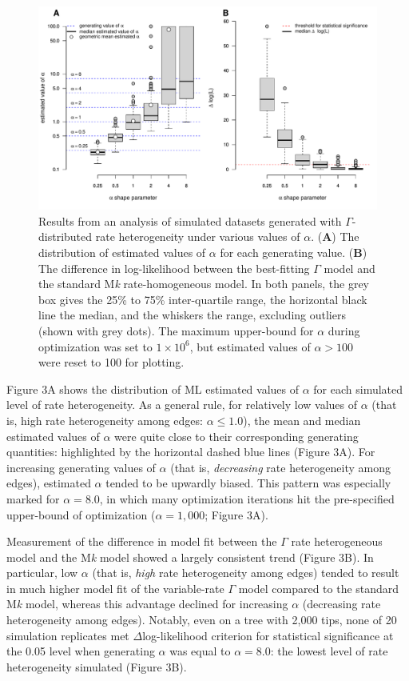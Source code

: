 \documentclass[fleqn,10pt,lineno]{wlpeerj} %
\begin{document}
\begin{figure}
\includegraphics[width=1\linewidth]{Revell-and-Harmon.fitgammaMk.PeerJ_files/figure-latex/Revell-and-Harmon-fig3-1} \caption{Results from an analysis of simulated datasets generated with $\Gamma$-distributed rate heterogeneity under various values of $\alpha$. (\textbf{A}) The distribution of estimated values of $\alpha$ for each generating value. (\textbf{B}) The difference in log-likelihood between the best-fitting $\Gamma$ model and the standard M\emph{k} rate-homogeneous model. In both panels, the grey box gives the 25\% to 75\% inter-quartile range, the horizontal black line the median, and the whiskers the range, excluding outliers (shown with grey dots). The maximum upper-bound for $\alpha$ during optimization was set to $1 \times 10^6$, but estimated values of $\alpha > 100$ were reset to 100 for plotting.}\label{fig:Revell-and-Harmon-fig3}
\end{figure}

Figure 3A shows the distribution of ML estimated values of \(\alpha\) for each simulated level of rate heterogeneity. As a general rule, for relatively low values of \(\alpha\) (that is, high rate heterogeneity among edges: \(\alpha \le 1.0\)), the mean and median estimated values of \(\alpha\) were quite close to their corresponding generating quantities: highlighted by the horizontal dashed blue lines (Figure 3A). For increasing generating values of \(\alpha\) (that is, \emph{decreasing} rate heterogeneity among edges), estimated \(\alpha\) tended to be upwardly biased. This pattern was especially marked for \(\alpha = 8.0\), in which many optimization iterations hit the pre-specified upper-bound of optimization (\(\alpha = 1,000\); Figure 3A).

Measurement of the difference in model fit between the \(\Gamma\) rate heterogeneous model and the M\emph{k} model showed a largely consistent trend (Figure 3B). In particular, low \(\alpha\) (that is, \emph{high} rate heterogeneity among edges) tended to result in much higher model fit of the variable-rate \(\Gamma\) model compared to the standard M\emph{k} model, whereas this advantage declined for increasing \(\alpha\) (decreasing rate heterogeneity among edges). Notably, even on a tree with 2,000 tips, none of 20 simulation replicates met \(\Delta\)log-likelihood criterion for statistical significance at the 0.05 level when generating \(\alpha\) was equal to \(\alpha = 8.0\): the lowest level of rate heterogeneity simulated (Figure 3B).
\end{document}
